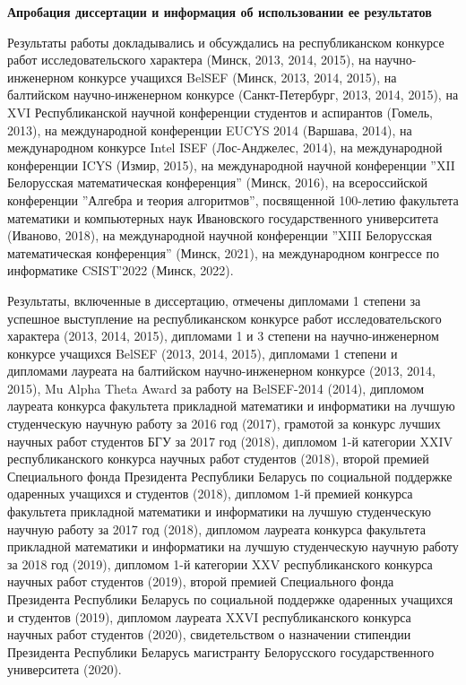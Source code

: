 \documentclass[_00_dissertation.tex]{subfiles}
\begin{document}
\begin{center}
\textbf{Апробация диссертации и информация об использовании ее результатов}
\end{center}

Результаты работы докладывались и обсуждались
на республиканском конкурсе работ исследовательского характера (Минск, 2013, 2014, 2015),
на научно-инженерном конкурсе учащихся BelSEF (Минск, 2013, 2014, 2015),
на балтийском научно-инженерном конкурсе (Санкт-Петербург, 2013, 2014, 2015),
на XVI Республиканской научной конференции студентов и аспирантов (Гомель, 2013),
на международной конференции EUCYS 2014 (Варшава, 2014),
на международном конкурсе Intel ISEF (Лос-Анджелес, 2014),
на международной конференции ICYS (Измир, 2015),
на международной научной конференции ''XII Белорусская математическая конференция'' (Минск, 2016),
на всероссийской конференции ''Алгебра и теория алгоритмов'', посвященной 100-летию факультета математики и компьютерных наук Ивановского государственного университета (Иваново, 2018),
на международной научной конференции ''XIII Белорусская математическая конференция'' (Минск, 2021),
на международном конгрессе по информатике CSIST'2022 (Минск, 2022).

Результаты, включенные в диссертацию, отмечены
дипломами 1 степени за успешное выступление на республиканском конкурсе работ исследовательского характера (2013, 2014, 2015),
дипломами 1 и 3 степени на научно-инженерном конкурсе учащихся BelSEF (2013, 2014, 2015),
дипломами 1 степени и дипломами лауреата на балтийском научно-инженерном конкурсе (2013, 2014, 2015),
Mu Alpha Theta Award за работу на BelSEF-2014 (2014),
дипломом лауреата конкурса факультета прикладной математики и информатики на лучшую студенческую научную работу за 2016 год (2017),
грамотой за конкурс лучших научных работ студентов БГУ за 2017 год (2018),
дипломом 1-й категории XXIV республиканского конкурса научных работ студентов (2018),
второй премией Специального фонда Президента Республики Беларусь по социальной поддержке одаренных учащихся и студентов (2018),
дипломом 1-й премией конкурса факультета прикладной математики и информатики на лучшую студенческую научную работу за 2017 год (2018),
дипломом лауреата конкурса факультета прикладной математики и информатики на лучшую студенческую научную работу за 2018 год (2019),
дипломом 1-й категории XXV республиканского конкурса научных работ студентов (2019),
второй премией Специального фонда Президента Республики Беларусь по социальной поддержке одаренных учащихся и студентов (2019),
дипломом лауреата XXVI республиканского конкурса научных работ студентов (2020),
свидетельством о назначении стипендии Президента Республики Беларусь магистранту Белорусского государственного университета (2020).
\end{document}

